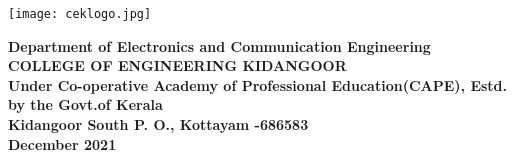 \documentclass{scrartcl}
\begin{document}
	\begin{center}
		\vspace*{\fill}
        \texttt{[image: ceklogo.jpg]} 
       
        \large 
        \textbf{
        Department of Electronics and Communication Engineering\\[0.5cm]
        \Large COLLEGE OF ENGINEERING KIDANGOOR\\
        \scriptsize Under Co-operative Academy of Professional Education(CAPE), Estd. by the Govt.of Kerala\\
        \large Kidangoor South P. O., Kottayam -686583\\
        December 2021}\\
        
   \end{center}
\end{document}
